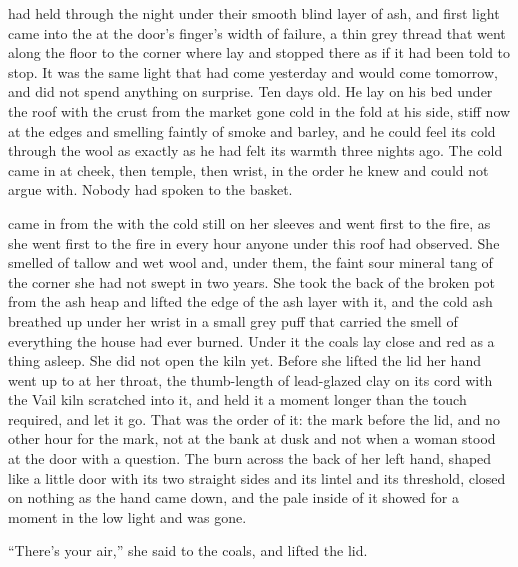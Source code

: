 
 had held through the night under their smooth blind layer of ash, and first light came into the  at the door's finger's width of failure, a thin grey thread that went along the floor to the corner where  lay and stopped there as if it had been told to stop. It was the same light that had come yesterday and would come tomorrow, and  did not spend anything on surprise. Ten days old. He lay on his bed under the roof with the crust from the market gone cold in the fold at his side, stiff now at the edges and smelling faintly of smoke and barley, and he could feel its cold through the wool as exactly as he had felt its warmth three nights ago. The cold came in at cheek, then temple, then wrist, in the order he knew and could not argue with. Nobody had spoken to the basket.

 came in from the  with the cold still on her sleeves and went first to the fire, as she went first to the fire in every hour anyone under this roof had observed. She smelled of tallow and wet wool and, under them, the faint sour mineral tang of the corner she had not swept in two years. She took the back of the broken pot from the ash heap and lifted the edge of the ash layer with it, and the cold ash breathed up under her wrist in a small grey puff that carried the smell of everything the house had ever burned. Under it the coals lay close and red as a thing asleep. She did not open the kiln yet. Before she lifted the lid her hand went up to  at her throat, the thumb-length of lead-glazed clay on its cord with the Vail kiln scratched into it, and held it a moment longer than the touch required, and let it go. That was the order of it: the mark before the lid, and no other hour for the mark, not at the bank at dusk and not when a woman stood at the door with a question. The burn across the back of her left hand, shaped like a little door with its two straight sides and its lintel and its threshold, closed on nothing as the hand came down, and the pale inside of it showed for a moment in the low light and was gone.

“There's your air,” she said to the coals, and lifted the lid.


